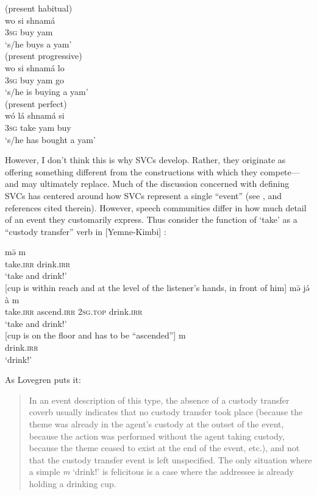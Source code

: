 \documentclass[output=paper]{langsci/langscibook}
\begin{document}
\ea
\label{ex:hyman:33}
\ea (present habitual)\\
\gll wo  si  shnamá  \\   
\textsc{3sg} buy   yam \\
\glt ‘s/he buys a yam’ \\
\ex (present progressive)\\
\gll wo  si  shnamá lo\\   
\textsc{3sg} buy   yam  go \\
\glt ‘s/he is buying a yam’\\
\ex (present perfect)\\
\gll wó  lá  shnamá  si \\   
\textsc{3sg} take   yam   buy \\
\glt ‘s/he has bought a yam’ \\
\z 
\z 

However, I don’t think this is why SVCs develop. Rather, they originate as offering something different from the constructions with which they compete—and may ultimately replace. Much of the discussion concerned with defining SVCs has centered around how SVCs represent\- a single “event” (see \citealt{BohnemeyerEtAl2007}, \citealt{Bisang2009} and references cited therein). However, speech communities differ in how much detail of an event they customarily express. Thus consider the function of ‘take’ as a “custody transfer” verb in  [Yemne-Kimbi] \citep{Lovegren2013}:

\ea
\label{ex:34}
\ea 
\gll m\=ə        m{\bassau} \\  
take.\textsc{irr} drink.\textsc{irr} \\
\glt ‘take and drink!’ \\
 {} [cup is within reach and at the level of the listener’s hands, in front of him]
\ex 
\gll m\=ə             j\'ə          à          m{\bassau} \\
take.\textsc{irr} ascend.\textsc{irr} \textsc{2sg.top} drink.\textsc{irr} \\
\glt ‘take and drink!’\\
 {} [cup is on the floor and has to be “ascended”]
\ex 
\gll m{\bassau}  \\
drink.\textsc{irr}\\
\glt ‘drink!’
\z 
\z 


As Lovegren puts it:
\begin{quotation}
In an event description of this type, the absence of a custody transfer coverb usually indicates that no custody transfer took place (because the theme was already in the agent's custody at the outset of the event, because the action was performed without the agent taking custody, because the theme ceased to exist at the end of the event, etc.), and not that the custody transfer event is left unspecified. The only situation where a simple  \textit{m{\bassau}}  ‘drink!’ is felicitous is a case where the addressee is already holding a drinking cup. \citep[222]{Lovegren2013}
\end{quotation}
\end{document}
